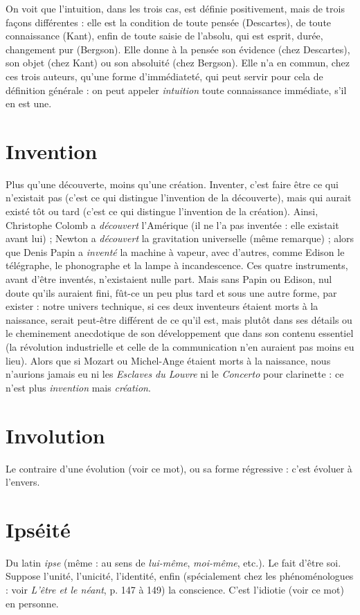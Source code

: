 {On voit que l'intuition, dans les trois cas, est définie positivement, mais de
trois façons différentes : elle est la condition de toute pensée (Descartes), de
toute connaissance (Kant), enfin de toute saisie de l'absolu, qui est esprit,
durée, changement pur (Bergson). Elle donne à la pensée son évidence (chez
Descartes), son objet (chez Kant) ou son absoluité (chez Bergson). Elle n’a en
commun, chez ces trois auteurs, qu’une forme d’immédiateté, qui peut servir
pour cela de définition générale : on peut appeler {\it intuition} toute connaissance
immédiate, s’il en est une.

\section{Invention}
Plus qu’une découverte, moins qu’une création. Inventer,
c'est faire être ce qui n’existait pas (c'est ce qui distingue
l'invention de la découverte), mais qui aurait existé tôt ou tard (c’est ce qui distingue
l'invention de la création). Ainsi, Christophe Colomb a {\it découvert} l'Amérique
(il ne l’a pas inventée : elle existait avant lui) ; Newton a {\it découvert} la gravitation
universelle (même remarque) ; alors que Denis Papin a {\it inventé} la
machine à vapeur, avec d’autres, comme Edison le télégraphe, le phonographe
et la lampe à incandescence. Ces quatre instruments, avant d’être inventés,
n’existaient nulle part. Mais sans Papin ou Edison, nul doute qu’ils auraient
fini, fût-ce un peu plus tard et sous une autre forme, par exister : notre univers
technique, si ces deux inventeurs étaient morts à la naissance, serait peut-être
différent de ce qu’il est, mais plutôt dans ses détails ou le cheminement anecdotique
de son développement que dans son contenu essentiel (la révolution
industrielle et celle de la communication n’en auraient pas moins eu lieu).
Alors que si Mozart ou Michel-Ange étaient morts à la naissance, nous
n’aurions jamais eu ni les {\it Esclaves du Louvre} ni le {\it Concerto} pour clarinette : ce
n'est plus {\it invention} mais {\it création}.

\section{Involution}
Le contraire d’une évolution (voir ce mot), ou sa forme
régressive : c’est évoluer à l'envers.

\section{Ipséité}
Du latin {\it ipse} (même : au sens de {\it lui-même}, {\it moi-même}, etc.). Le fait
d’être soi. Suppose l’unité, l’unicité, l'identité, enfin (spécialement
chez les phénoménologues : voir {\it L'être et le néant}, p. 147 à 149) la conscience.
C’est l’idiotie (voir ce mot) en personne.

}
